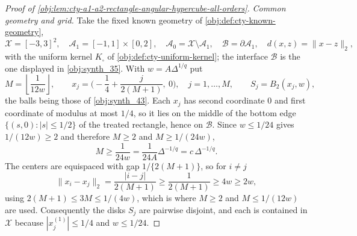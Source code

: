 \begin{proof}[Proof of \cref{obj:lem:cty-a1-a2-rectangle-angular-hypercube-all-orders}]
\emph{Common geometry and grid.}
Take the fixed known geometry of \cref{obj:def:cty-known-geometry},
\[
\mathcal X=[-3,3]^2,
\quad
\mathcal A_1=[-1,1]\times[0,2],
\quad
\mathcal A_0=\mathcal X\setminus\mathcal A_1,
\quad
\mathcal B=\partial\mathcal A_1,
\quad
d(x,z)=\lVert x-z\rVert_2,
\]
with the uniform kernel \(K_\square\) of \cref{obj:def:cty-uniform-kernel}; the interface \(\mathcal B\) is the one displayed in \cref{obj:synth_35}.  With \(w=A\Delta^{1/q}\) put
\[
M=\left\lfloor\frac1{12w}\right\rfloor,
\qquad
x_j=\bigl(-\frac14+\frac{j}{2(M+1)},\ 0\bigr),
\quad j=1,\ldots,M,
\qquad
S_j=B_2(x_j,w),
\]
the balls being those of \cref{obj:synth_43}.
Each \(x_j\) has second coordinate \(0\) and first coordinate of modulus at most \(1/4\), so it lies on the middle of the bottom edge \(\{(s,0):|s|\leq1/2\}\) of the treated rectangle, hence on \(\mathcal B\).
Since \(w\leq1/24\) gives \(1/(12w)\geq2\) and therefore \(M\geq2\) and \(M\geq 1/(24w)\),
\[
M\geq\frac1{24w}=\frac1{24A}\Delta^{-1/q}=c\,\Delta^{-1/q}.
\]
The centers are equispaced with gap \(1/\{2(M+1)\}\), so for \(i\neq j\)
\[
\lVert x_i-x_j\rVert_2=\frac{|i-j|}{2(M+1)}\geq\frac1{2(M+1)}\geq 4w\geq 2w,
\]
using \(2(M+1)\leq3M\leq 1/(4w)\), which is where \(M\geq2\) and \(M\leq1/(12w)\) are used.
Consequently the disks \(S_j\) are pairwise disjoint, and each is contained in \(\mathcal X\) because \(|x_j^{(1)}|\leq1/4\) and \(w\leq1/24\).


\end{proof}
